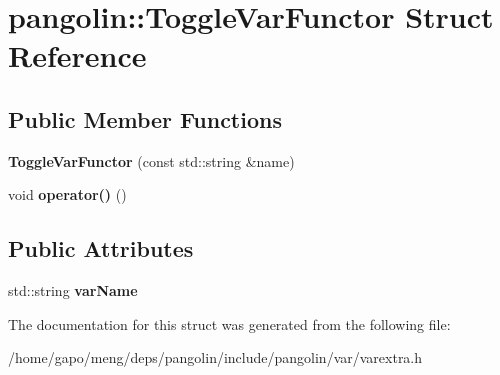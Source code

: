 \hypertarget{structpangolin_1_1_toggle_var_functor}{}\section{pangolin\+:\+:Toggle\+Var\+Functor Struct Reference}
\label{structpangolin_1_1_toggle_var_functor}
\subsection*{Public Member Functions}
\begin{DoxyCompactItemize}
\item 
{\bfseries Toggle\+Var\+Functor} (const std\+::string \&name)\hypertarget{structpangolin_1_1_toggle_var_functor_a75f9e14ad65576a86f4dd715b2250cbf}{}\label{structpangolin_1_1_toggle_var_functor_a75f9e14ad65576a86f4dd715b2250cbf}

\item 
void {\bfseries operator()} ()\hypertarget{structpangolin_1_1_toggle_var_functor_acaada2ab666dd4f8657591c7fff89e1b}{}\label{structpangolin_1_1_toggle_var_functor_acaada2ab666dd4f8657591c7fff89e1b}

\end{DoxyCompactItemize}
\subsection*{Public Attributes}
\begin{DoxyCompactItemize}
\item 
std\+::string {\bfseries var\+Name}\hypertarget{structpangolin_1_1_toggle_var_functor_aa42d93a5b72621880dc2c3ea3f88fa50}{}\label{structpangolin_1_1_toggle_var_functor_aa42d93a5b72621880dc2c3ea3f88fa50}

\end{DoxyCompactItemize}


The documentation for this struct was generated from the following file\+:\begin{DoxyCompactItemize}
\item 
/home/gapo/meng/deps/pangolin/include/pangolin/var/varextra.\+h\end{DoxyCompactItemize}

